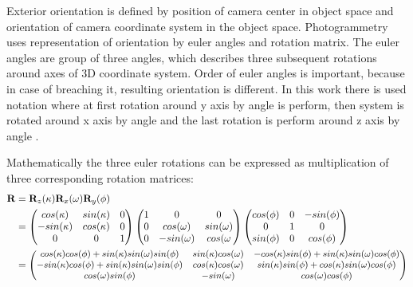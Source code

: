 \documentclass[a4paper,12pt]{report}
\newcommand{\ematr}[1]{
{\bf #1}
}
\newcommand{\escal}[1]{
{\it #1}
}
\begin{document}
Exterior orientation is defined by position of camera center in object space and orientation of camera coordinate system in the object space.
Photogrammetry uses representation of orientation by euler angles and rotation matrix.
The euler angles are group of three angles, which describes three subsequent rotations
 around axes of 3D coordinate system. 
 Order of euler angles is important, because in case of breaching it, resulting orientation is different. 
 In this work there is used notation where at first rotation around y axis by angle \escal{\phi} is 
 perform, then system is rotated around x axis  by angle \escal{\omega} and
 the last rotation is perform around z axis by angle \escal{\kappa}.
 
Mathematically the three euler rotations can be expressed as multiplication of three corresponding
rotation matrices:
 \begin{equation}
 \begin{split}
\ematr{R} &= \ematr{R}_{z}(\escal{\kappa}) \ematr{R}_{x}(\escal{\omega}) \ematr{R}_{y}(\escal{\phi}) \\
	  &= \begin{pmatrix}
	      cos(\escal{\kappa}) & sin(\escal{\kappa}) & 0 \\
	      -sin(\escal{\kappa}) & cos(\escal{\kappa}) & 0 \\
	      0 & 0 & 1
	      \end{pmatrix}
	      \begin{pmatrix}
	      1 & 0 & 0 \\
	      0 & cos(\escal{\omega}) & sin(\escal{\omega}) \\
	      0 & -sin(\escal{\omega}) & cos(\escal{\omega} 
	      \end{pmatrix}
	      \begin{pmatrix}
	      cos(\escal{\phi}) & 0 & -sin(\escal{\phi}) \\
	      0 & 1 & 0 \\
	      sin(\phi) & 0 & cos(\phi)      
	      \end{pmatrix} \\
	  &=  
	      \small
	      \begin{pmatrix}
	      cos(\escal{\kappa}) cos(\escal{\phi}) + sin(\escal{\kappa}) sin(\escal{\omega}) sin(\escal{\phi}) & 
	      sin(\escal{\kappa}) cos(\escal{\omega})  & 
	      -cos(\escal{\kappa}) sin(\escal{\phi}) + sin(\escal{\kappa}) sin(\escal{\omega}) cos(\escal{\phi}) 
	      \\
	      -sin(\escal{\kappa}) cos(\escal{\phi}) + sin(\escal{\kappa}) sin(\escal{\omega}) sin(\escal{\phi}) & 
	      cos(\escal{\kappa}) cos(\escal{\omega})  & 
	      sin(\escal{\kappa}) sin(\escal{\phi}) + cos(\escal{\kappa}) sin(\escal{\omega}) cos(\escal{\phi}) 
	      \\	      
	      cos(\escal{\omega}) sin(\escal{\phi}) & 
	      -sin(\escal{\omega})  & 
	      cos(\escal{\omega}) cos(\escal{\phi}) 
	      \\		      
	      \end{pmatrix} 
\end{split}
\end{equation}
\end{document}
